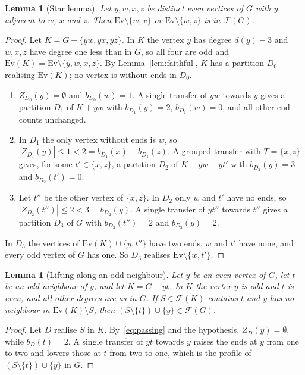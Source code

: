 \documentclass[11pt]{amsart}
\newtheorem{lemma}[theorem]{Lemma}
\theoremstyle{definition}
\newcommand{\cF}{\mathcal F}
\newcommand{\Ev}{\mathrm{Ev}}
\begin{document}
\begin{lemma}[Star lemma]\label{lem:star}
Let $y,w,x,z$ be distinct even vertices of $G$ with $y$ adjacent to $w$, $x$ and $z$. Then
$\Ev\setminus\{w,x\}$ or $\Ev\setminus\{w,z\}$ is in $\cF(G)$.
\end{lemma}

\begin{proof}
Let $K=G-\{yw,yx,yz\}$. In $K$ the vertex $y$ has degree $d(y)-3$ and $w,x,z$ have degree one less
than in $G$, so all four are odd and $\Ev(K)=\Ev\setminus\{y,w,x,z\}$. By Lemma~\ref{lem:faithful},
$K$ has a partition $D_0$ realising $\Ev(K)$; no vertex is without ends in $D_0$.
\begin{enumerate}
\item $Z_{D_0}(y)=\emptyset$ and $b_{D_0}(w)=1$. A single transfer of $yw$ towards $y$ gives a
partition $D_1$ of $K+yw$ with $b_{D_1}(y)=2$, $b_{D_1}(w)=0$, and all other end counts unchanged.
\item In $D_1$ the only vertex without ends is $w$, so $|Z_{D_1}(y)|\le1<2=b_{D_1}(x)+b_{D_1}(z)$.
A grouped transfer with $T=\{x,z\}$ gives, for some $t'\in\{x,z\}$, a partition $D_2$ of
$K+yw+yt'$ with $b_{D_2}(y)=3$ and $b_{D_2}(t')=0$.
\item Let $t''$ be the other vertex of $\{x,z\}$. In $D_2$ only $w$ and $t'$ have no ends, so
$|Z_{D_2}(t'')|\le2<3=b_{D_2}(y)$. A single transfer of $yt''$ towards $t''$ gives a partition $D_3$
of $G$ with $b_{D_3}(t'')=2$ and $b_{D_3}(y)=2$.
\end{enumerate}
In $D_3$ the vertices of $\Ev(K)\cup\{y,t''\}$ have two ends, $w$ and $t'$ have none, and every odd
vertex of $G$ has one. So $D_3$ realises $\Ev\setminus\{w,t'\}$.
\end{proof}

\begin{lemma}[Lifting along an odd neighbour]\label{lem:lift}
Let $y$ be an even vertex of $G$, let $t$ be an odd neighbour of $y$, and let $K=G-yt$. In $K$ the
vertex $y$ is odd and $t$ is even, and all other degrees are as in $G$. If $S\in\cF(K)$ contains $t$
and $y$ has no neighbour in $\Ev(K)\setminus S$, then $(S\setminus\{t\})\cup\{y\}\in\cF(G)$.
\end{lemma}

\begin{proof}
Let $D$ realise $S$ in $K$. By~\eqref{eq:passing} and the hypothesis, $Z_D(y)=\emptyset$, while
$b_D(t)=2$. A single transfer of $yt$ towards $y$ raises the ends at $y$ from one to two and lowers
those at $t$ from two to one, which is the profile of $(S\setminus\{t\})\cup\{y\}$ in $G$.
\end{proof}
\end{document}

